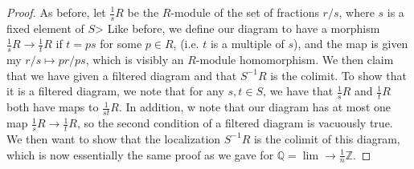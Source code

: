 \documentclass[psamsfonts]{amsart}
\theoremstyle{definition}
\theoremstyle{remark}
\newcommand{\Q}{\mathbb{Q}}
\newcommand{\Z}{\mathbb{Z}}
\newcommand{\inv}{^{-1}}
\begin{document}
%
\begin{proof}
As before, let $\frac{1}{s}R$ be the $R$-module of the set of fractions $r/s$, where $s$ is a fixed element of $S$> Like before, we define our diagram to have a morphism $\frac{1}{s}R \to \frac{1}{t}R$ if $t = ps$ for some $p \in R$, (i.e. $t$ is a multiple of $s$), and the map is given my $r/s \mapsto pr/ps$, which is visibly an $R$-module homomorphism. We then claim that we have given a filtered diagram and that $S\inv R$ is the colimit. To show that it is a filtered diagram, we note that for any $s,t \in S$, we have that $\frac{1}{s}R$ and $\frac{1}{t}R$ both have maps to $\frac{1}{st}R$. In addition, w note that our diagram has at most one map $\frac{1}{s}R \to \frac{1}{t}R$, so the second condition of a filtered diagram is vacuously true. We then want to show that the localization $S\inv R$ is the colimit of this diagram, which is now essentially the same proof as we gave for $\Q = \lim\limits\to \frac{1}{n}\Z$.
\end{proof}
\end{document}
